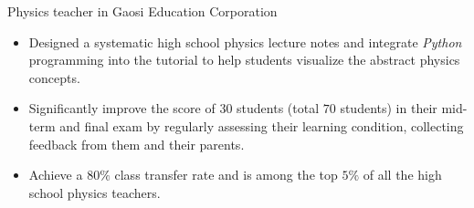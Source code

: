 
\begin{cventries}
    \cventry
    {Physics teacher in Gaosi Education Corporation}
    {}
    {}
    {}
    {
        \begin{itemize}
            \item Designed a systematic high school physics lecture notes and integrate \textit{Python} programming into the tutorial to help students visualize the abstract physics concepts.
            \item Significantly improve the score of $30$ students (total $70$ students) in their mid-term and final exam by regularly assessing their learning condition, collecting feedback from them and their parents.
            \item Achieve a $80\%$ class transfer rate and is among the top $5\%$ of all the high school physics teachers.
        \end{itemize}
    }
\end{cventries}
